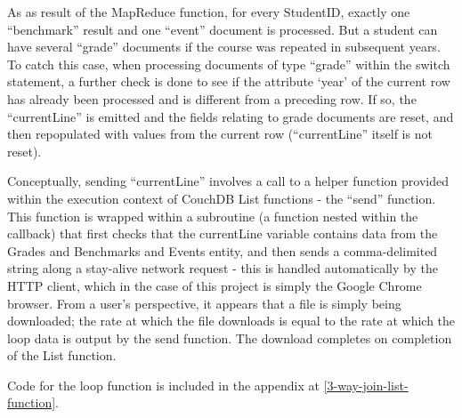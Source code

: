 As as result of the MapReduce function, for every StudentID, exactly one ``benchmark'' result and one ``event'' document is processed. But a student can have several ``grade'' documents if the course was repeated in subsequent years. To catch this case, when processing documents of type ``grade'' within the switch statement, a further check is done to see if the attribute `year' of the current row has already been processed and is different from a preceding row. If so, the ``currentLine'' is emitted and the fields relating to grade documents are reset, and then repopulated with values from the current row (``currentLine'' itself is not reset).

Conceptually, sending ``currentLine'' involves a call to a helper function provided within the execution context of CouchDB List functions - the ``send'' function. This function is wrapped within a subroutine (a function nested within the callback) that first checks that the currentLine variable contains data from the Grades and Benchmarks and Events entity, and then sends a comma-delimited string along a stay-alive network request - this is handled automatically by the HTTP client, which in the case of this project is simply the Google Chrome browser. From a user's perspective, it appears that a file is simply being downloaded; the rate at which the file downloads is equal to the rate at which the loop data is output by the send function. The download completes on completion of the List function.

Code for the loop function is included in the appendix at \ref{3-way-join-list-function}.